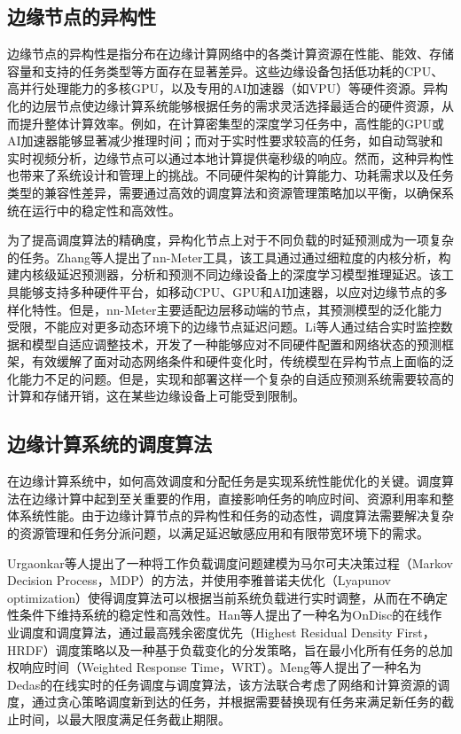 \subsection{边缘节点的异构性}

边缘节点的异构性是指分布在边缘计算网络中的各类计算资源在性能、能效、存储容量和支持的任务类型等方面存在显著差异\cite{cooke2020model,varghese2021survey}。这些边缘设备包括低功耗的CPU、高并行处理能力的多核GPU，以及专用的AI加速器（如VPU）等硬件资源。异构化的边层节点使边缘计算系统能够根据任务的需求灵活选择最适合的硬件资源，从而提升整体计算效率\cite{varghese2020survey}。例如，在计算密集型的深度学习任务中，高性能的GPU或AI加速器能够显著减少推理时间；而对于实时性要求较高的任务，如自动驾驶和实时视频分析，边缘节点可以通过本地计算提供毫秒级的响应。然而，这种异构性也带来了系统设计和管理上的挑战。不同硬件架构的计算能力、功耗需求以及任务类型的兼容性差异，需要通过高效的调度算法和资源管理策略加以平衡，以确保系统在运行中的稳定性和高效性\cite{das2018edgebench}。

为了提高调度算法的精确度，异构化节点上对于不同负载的时延预测成为一项复杂的任务。Zhang\cite{zhang2021nn}等人提出了nn-Meter工具，该工具通过通过细粒度的内核分析，构建内核级延迟预测器，分析和预测不同边缘设备上的深度学习模型推理延迟。该工具能够支持多种硬件平台，如移动CPU、GPU和AI加速器，以应对边缘节点的多样化特性。但是，nn-Meter主要适配边层移动端的节点，其预测模型的泛化能力受限，不能应对更多动态环境下的边缘节点延迟问题。Li\cite{li2022inference}等人通过结合实时监控数据和模型自适应调整技术，开发了一种能够应对不同硬件配置和网络状态的预测框架，有效缓解了面对动态网络条件和硬件变化时，传统模型在异构节点上面临的泛化能力不足的问题。但是，实现和部署这样一个复杂的自适应预测系统需要较高的计算和存储开销，这在某些边缘设备上可能受到限制。

\subsection{边缘计算系统的调度算法}

在边缘计算系统中，如何高效调度和分配任务是实现系统性能优化的关键。调度算法在边缘计算中起到至关重要的作用，直接影响任务的响应时间、资源利用率和整体系统性能。由于边缘计算节点的异构性和任务的动态性，调度算法需要解决复杂的资源管理和任务分派问题，以满足延迟敏感应用和有限带宽环境下的需求。

Urgaonkar\cite{urgaonkar2015dynamic}等人提出了一种将工作负载调度问题建模为马尔可夫决策过程（Markov Decision Process，MDP）的方法，并使用李雅普诺夫优化（Lyapunov optimization）使得调度算法可以根据当前系统负载进行实时调整，从而在不确定性条件下维持系统的稳定性和高效性。Han\cite{han2019ondisc}等人提出了一种名为OnDisc的在线作业调度和调度算法，通过最高残余密度优先（Highest Residual Density First，HRDF）调度策略以及一种基于负载变化的分发策略，旨在最小化所有任务的总加权响应时间（Weighted Response Time，WRT）。Meng等人\cite{meng2019online}提出了一种名为Dedas的在线实时的任务调度与调度算法，该方法联合考虑了网络和计算资源的调度，通过贪心策略调度新到达的任务，并根据需要替换现有任务来满足新任务的截止时间，以最大限度满足任务截止期限。


